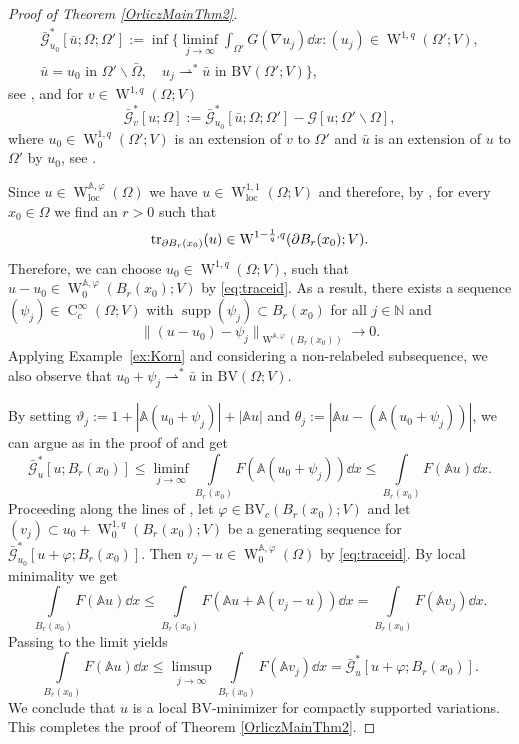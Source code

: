 \documentclass[a4paper,11pt]{amsart}
\numberwithin{equation}{section}
\newcommand{\sobo}{\operatorname{W}}
\newcommand{\hold}{\operatorname{C}}
\begin{document}
\begin{proof}[Proof of Theorem \ref{OrliczMainThm2}]
{\begin{multline*}
				\bar{\mathcal{G}}_{u_0}^*[\bar{u}; \Omega; \Omega'] := \inf \Big\{ \liminf_{j \to \infty} \int_{\Omega'} G(\nabla u_j) \dd{x}: 
				(u_j) \in \sobo^{1,q}(\Omega'; V), \\
				\bar{u}=u_0 \text{ in } \Omega' \backslash \bar{\Omega}, \quad u_j \rightharpoonup^* \bar{u} \text{ in } \mathrm{BV}(\Omega'; V) \Big\},
			\end{multline*}
			see \cite[Equation 1.9]{gmeineder_quasiconvex_2024}, and for $v \in \sobo^{1,q}(\Omega;V)$  \[
			\bar{\mathcal{G}}_{v}^*[u; \Omega] := \bar{\mathcal{G}}_{u_0}^*[\bar{u}; \Omega; \Omega'] - \mathcal{G}[u; \Omega' \backslash \Omega],
			\]
			where $u_0 \in \sobo^{1,q}_0(\Omega';V)$ is an extension of $v$ to $\Omega'$ and $\bar{u}$ is an extension of $u$ to $\Omega'$ by $u_0$, see \cite[Equation 1.10]{gmeineder_quasiconvex_2024}.
		} 
		
		Since $u \in\sobo_\text{loc}^{\mathbb{A},\varphi}(\Omega)$ we have $u \in\sobo_\text{loc}^{1,1}(\Omega{; V})$ and therefore, {by \cite[Corollary 4.2]{gmeineder_quasiconvex_2024}}, for every $x_0 \in \Omega$ we find an $r>0$ such that  
		\[
		\tr_{\partial B_r(x_0)}(u) \in \sobo^{1-\frac{1}{q},q}(\partial B_r(x_0);V).
		\]
		Therefore, we can choose $u_0 \in \sobo^{1,q}(\Omega; V)$, such that $u-u_0 \in \sobo^{\mathbb{A},\varphi}_0(B_r(x_0); V)$ {by \eqref{eq:traceid}}.
		As a result, there exists a sequence $(\psi_j) \in \hold_c^\infty(\Omega;V)$ with $\operatorname{supp}(\psi_j) \subset B_r(x_0)$ for all $j \in \mathbb{N}$ and \[
		\| (u-u_0) - \psi_j \|_{\sobo^{\mathbb{A},\varphi}(B_r(x_0))} \to 0. 
		\]
		{Applying Example~\ref{ex:Korn}} and considering a non-relabeled
		subsequence, we also observe that $u_0 + \psi_j \rightharpoonup^* \bar{u}$ in $\mathrm{BV}(\Omega;V)$. 
		
		By setting $\vartheta_j := 1+ |\mathbb{A}(u_0 + \psi_j)| + |\mathbb{A}u|$ and $\theta_j := |\mathbb{A}u - (\mathbb{A}(u_0 + \psi_j))|$, we can argue as in the proof of \cite[Theorem 10.7]{gmeineder_quasiconvex_2024} and get \[
		\bar{\mathcal{G}}_u^*[u; B_r(x_0)] \leq \liminf \limits_{j \to \infty} \int \limits_{B_r(x_0)} F(\mathbb{A}(u_0 + \psi_j)) \dd{x} \leq  \int \limits_{B_r(x_0)} F(\mathbb{A}u) \dd{x}.
		\]
		{Proceeding along the lines of \cite[Theorem 10.7]{gmeineder_quasiconvex_2024},} let $\varphi \in \mathrm{BV}_c(B_r(x_0);V)$ and let $(v_j) \subset u_0 + \sobo_0^{1,q}(B_r(x_0);V)$ be a generating sequence for 
		$\bar{\mathcal{G}}_{u_0}^*[u+\varphi; B_r(x_0)]$. Then $v_j - u \in \sobo_0^{\mathbb{A},\varphi}(\Omega)$ by {\eqref{eq:traceid}}. By local minimality we get \[
		\int \limits_{B_r(x_0)} F(\mathbb{A}u) \dd{x} \leq \int \limits_{B_r(x_0)} F(\mathbb{A}u + \mathbb{A}(v_j - u)) \dd{x} = \int \limits_{B_r(x_0)} F(\mathbb{A}v_j) \dd{x}.
		\]
		Passing to the limit yields \[
		\int \limits_{B_r(x_0)} F(\mathbb{A}u) \dd{x} \leq \limsup \limits_{j \to \infty} \int \limits_{B_r(x_0)} F(\mathbb{A}v_j) \dd{x} = \bar{\mathcal{G}}_{u}^*[u+\varphi; B_r(x_0)].
		\]
		We conclude that $u$ is a local $\mathrm{BV}$-minimizer for compactly supported variations.
		This completes the proof of Theorem \ref{OrliczMainThm2}.
	\end{proof}
	
\end{document}
